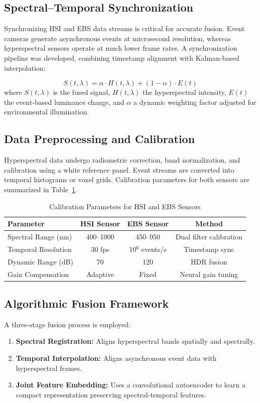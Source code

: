 \documentclass[conference]{IEEEtran}
\begin{document}
\subsection{Spectral–Temporal Synchronization}
Synchronizing HSI and EBS data streams is critical for accurate fusion. Event cameras generate asynchronous events at microsecond resolution, whereas hyperspectral sensors operate at much lower frame rates. A synchronization pipeline was developed, combining timestamp alignment with Kalman-based interpolation:

\begin{equation}
S(t,\lambda) = \alpha \cdot H(t,\lambda) + (1-\alpha) \cdot E(t)
\end{equation}
where \(S(t,\lambda)\) is the fused signal, \(H(t,\lambda)\) the hyperspectral intensity, \(E(t)\) the event-based luminance change, and \(\alpha\) a dynamic weighting factor adjusted for environmental illumination.

\subsection{Data Preprocessing and Calibration}
Hyperspectral data undergo radiometric correction, band normalization, and calibration using a white reference panel. Event streams are converted into temporal histograms or voxel grids. Calibration parameters for both sensors are summarized in Table~\ref{tab:calibration}.

\begin{table}[H]
\centering
\caption{Calibration Parameters for HSI and EBS Sensors}
\label{tab:calibration}
\begin{tabular}{lccc}
\toprule
Parameter & HSI Sensor & EBS Sensor & Method \\
\midrule
Spectral Range (nm) & 400–1000 & 450–950 & Dual filter calibration \\
Temporal Resolution & 30 fps & 10$^6$ events/s & Timestamp sync \\
Dynamic Range (dB) & 70 & 120 & HDR fusion \\
Gain Compensation & Adaptive & Fixed & Neural gain tuning \\
\bottomrule
\end{tabular}
\end{table}

\subsection{Algorithmic Fusion Framework}
A three-stage fusion process is employed:
\begin{enumerate}
    \item \textbf{Spectral Registration:} Aligns hyperspectral bands spatially and spectrally.
    \item \textbf{Temporal Interpolation:} Aligns asynchronous event data with hyperspectral frames.
    \item \textbf{Joint Feature Embedding:} Uses a convolutional autoencoder to learn a compact representation preserving spectral-temporal features.
\end{enumerate}
\end{document}
